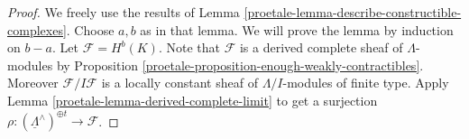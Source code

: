 \begin{proof}

We freely use the results of
Lemma \ref{proetale-lemma-describe-constructible-complexes}.
Choose $a, b$ as in that lemma. We will prove the lemma by
induction on $b - a$. Let $\mathcal{F} = H^b(K)$.
Note that $\mathcal{F}$ is a derived complete sheaf of
$\Lambda$-modules by
Proposition \ref{proetale-proposition-enough-weakly-contractibles}.
Moreover $\mathcal{F}/I\mathcal{F}$ is a locally
constant sheaf of $\Lambda/I$-modules of finite type.
Apply Lemma \ref{proetale-lemma-derived-complete-limit} to get a surjection
$\rho : (\underline{\Lambda}^\wedge)^{\oplus t} \to \mathcal{F}$.


\end{proof}
